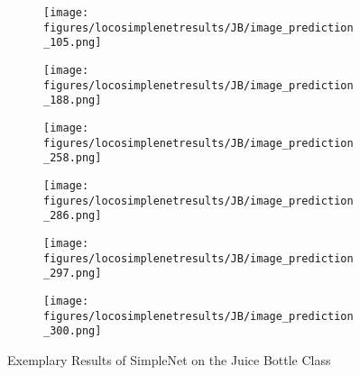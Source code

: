 \begin{figure}[htbp]
    \captionsetup[subfigure]{justification=centering}
    \centering
    \begin{subfigure}[b]{0.3\textwidth}
        \centering
        \texttt{[image: figures/locosimplenetresults/JB/image\_prediction\_105.png]}

    \end{subfigure}
    \begin{subfigure}[b]{0.3\textwidth}
        \centering
        \texttt{[image: figures/locosimplenetresults/JB/image\_prediction\_188.png]}

    \end{subfigure}
    \begin{subfigure}[b]{0.3\textwidth}
        \centering
        \texttt{[image: figures/locosimplenetresults/JB/image\_prediction\_258.png]}

    \end{subfigure}
    \begin{subfigure}[b]{0.3\textwidth}
        \centering
        \texttt{[image: figures/locosimplenetresults/JB/image\_prediction\_286.png]}

    \end{subfigure}
    \begin{subfigure}[b]{0.3\textwidth}
        \centering
        \texttt{[image: figures/locosimplenetresults/JB/image\_prediction\_297.png]}

    \end{subfigure}
    \begin{subfigure}[b]{0.3\textwidth}
        \centering
        \texttt{[image: figures/locosimplenetresults/JB/image\_prediction\_300.png]}

    \end{subfigure}
    \caption{Exemplary Results of SimpleNet on the Juice Bottle Class}
    \label{fig:SNJB}
\end{figure}